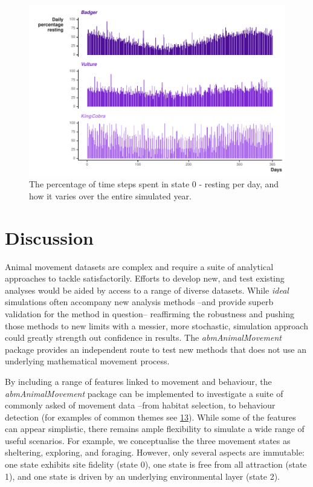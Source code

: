 \documentclass[10pt,a4paper]{article}
\begin{document}
\begin{figure}

{\centering \includegraphics{Agent-based_model_walkthrough_files/figure-latex/cycleSeasonalFigure-1} 

}

\caption{The percentage of time steps spent in state 0 - resting per day, and how it varies over the entire simulated year.}\label{fig:cycleSeasonalFigure}
\end{figure}

\hypertarget{discussion}{%
\section{Discussion}\label{discussion}}

Animal movement datasets are complex and require a suite of analytical approaches to tackle satisfactorily.
Efforts to develop new, and test existing analyses would be aided by access to a range of diverse datasets.
While \emph{ideal} simulations often accompany new analysis methods --and provide superb validation for the method in question-- reaffirming the robustness and pushing those methods to new limits with a messier, more stochastic, simulation approach could greatly strength out confidence in results.
The \emph{abmAnimalMovement} package provides an independent route to test new methods that does not use an underlying mathematical movement process.

By including a range of features linked to movement and behaviour, the \emph{abmAnimalMovement} package can be implemented to investigate a suite of commonly asked of movement data --from habitat selection, to behaviour detection (for examples of common themes see \protect\hyperlink{ref-joo_recent_2022}{13}).
While some of the features can appear simplistic, there remains ample flexibility to simulate a wide range of useful scenarios.
For example, we conceptualise the three movement states as sheltering, exploring, and foraging.
However, only several aspects are immutable: one state exhibits site fidelity (state 0), one state is free from all attraction (state 1), and one state is driven by an underlying environmental layer (state 2).
\end{document}
